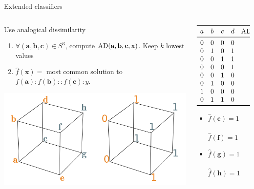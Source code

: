 \documentclass{beamer}
\begin{document}
\begin{frame}{Extended classifiers \cite{BayMicDelIJCAI07}}
  \begin{columns}
    \begin{column}{0.5\textwidth}
  Use \alert{analogical dissimilarity}
    \begin{enumerate}
      \item $\forall (\mathbf{a}, \mathbf{b}, \mathbf{c}) \in S^3$, compute
        $\text{AD}(\mathbf{a}, \mathbf{b}, \mathbf{c}, \mathbf{x})$.
        Keep $k$ lowest values
      \item $\hat{f}(\mathbf{x}) =$ most common solution to $f(\mathbf{a}) :
        f(\mathbf{b}) :: f(\mathbf{c}) : y$.
    \end{enumerate}
      \begin{center}
        \includegraphics[width=.8\textwidth]{figures/ae_example2_pres.png}
      \end{center}
    \end{column}
    \begin{column}{0.5\textwidth}
      {\tiny
      $$
      \begin{array}{ccccc}
        \toprule
        a & b & c & d &  \AD(a, b, c, d)\\
        \midrule
        0 & 0 & 0 & 0 &   \textbf{0}\\
        0 & 1 & 0 & 1 &   \textbf{0}\\
        0 & 0 & 1 & 1 &   \textbf{0}\\
        0 & 0 & 0 & 1 &   \textbf{1}\\
        0 & 0 & 1 & 0 &   \textbf{1}\\
        0 & 1 & 0 & 0 &   \textbf{1}\\
        1 & 0 & 0 & 0 &   \textbf{1}\\
        0 & 1 & 1 & 0 &   \textbf{2}\\
        \bottomrule
      \end{array}
      $$
      }
      \begin{itemize}
      \item $\hat{f}(\mathbf{c}) = 1$ ~~~
        $\hat{f}(\mathbf{f}) = 1$
      \item $\hat{f}(\mathbf{g}) = 1$ ~~~
        $\hat{f}(\mathbf{h}) = 1$
      \end{itemize}
    \end{column}
  \end{columns}
\end{frame}
\end{document}
